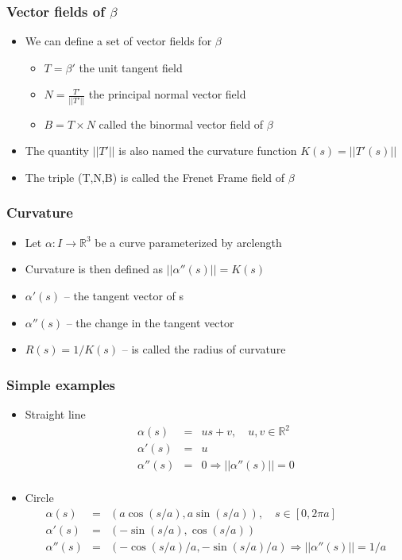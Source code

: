 \documentclass[10pt]{beamer}
\begin{document}
\begin{frame}
  \frametitle{Vector fields of $\beta$}
  \begin{itemize}
  \item We can define a set of vector fields for $\beta$
    \begin{itemize}
    \item $T = \beta'$ the unit tangent field
    \item $N = \frac{T'}{||T'||}$ the principal normal vector field
    \item $B = T \times N$ called the binormal vector field of $\beta$
    \end{itemize}
  \item The quantity $||T'||$ is also named the curvature function $K(s) = ||T'(s)||$
  \item The triple (T,N,B) is called the Frenet Frame field of $\beta$
  \end{itemize}
\end{frame}

\begin{frame}
  \frametitle{Curvature}
  \begin{itemize}
  \item Let $\alpha: I \rightarrow \mathbb{R}^3$ be a curve parameterized by arclength
  \item Curvature is then defined as $||\alpha''(s)|| = K(s)$
  \item $\alpha'(s)$ -- the tangent vector of s
  \item $\alpha''(s)$ -- the change in the tangent vector 
  \item $R(s) = 1/K(s)$ -- is called the radius of curvature
  \end{itemize}
\end{frame}

\begin{frame}
  \frametitle{Simple examples}
  \begin{itemize}
  \item Straight line
    \[
      \begin{array}{rcl}
        \alpha(s)   & = & us + v, \mbox{~~~} u,v \in \mathbb{R}^2\\
        \alpha'(s)  & = & u\\
        \alpha''(s) & = & 0 \Rightarrow ||\alpha''(s)|| = 0\\
      \end{array}
    \]
  \item Circle
    \[
      \begin{array}{rcl}
        \alpha(s)   & = & (a \cos (s/a), a \sin (s/a)), \mbox{~~~} s \in [0,2 \pi a]\\
        \alpha'(s)  & = & ( -\sin(s/a), \cos (s/a))\\
        \alpha''(s) & = & (-\cos (s/a) / a, -\sin(s/a) / a) \Rightarrow ||\alpha''(s)|| = 1/a\\
      \end{array}
    \]
  \end{itemize}
\end{frame}
\end{document}
